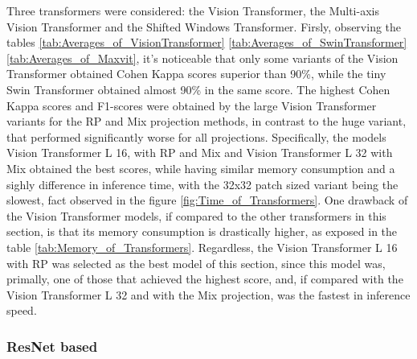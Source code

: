 Three transformers were considered: the Vision Transformer, the Multi-axis Vision Transformer and the Shifted Windows Transformer. Firsly, observing the tables \ref{tab:Averages_of_VisionTransformer} \ref{tab:Averages_of_SwinTransformer} \ref{tab:Averages_of_Maxvit}, it's noticeable that only some variants of the Vision Transformer obtained Cohen Kappa scores superior than 90\%, while the tiny Swin Transformer obtained almost 90\% in the same score. The highest Cohen Kappa scores and F1-scores were obtained by the large Vision Transformer variants for the \acrshort{RP} and \acrshort{Mix} projection methods, in contrast to the huge variant, that performed significantly worse for all projections. Specifically, the models Vision Transformer L 16, with \acrshort{RP} and \acrshort{Mix} and Vision Transformer L 32 with \acrshort{Mix} obtained the best scores, while having similar memory consumption and a sighly difference in inference time, with the 32x32 patch sized variant being the slowest, fact observed in the figure \ref{fig:Time_of_Transformers}. One drawback of the Vision Transformer models, if compared to the other transformers in this section, is that its memory consumption is drastically higher, as exposed in the table \ref{tab:Memory_of_Transformers}. Regardless, the Vision Transformer L 16 with \acrshort{RP} was selected as the best model of this section, since this model was, primally, one of those that achieved the highest score, and, if compared with the Vision Transformer L 32 and with the \acrshort{Mix} projection, was the fastest in inference speed.

\pagebreak






\pagebreak

\subsubsection{ResNet based}

